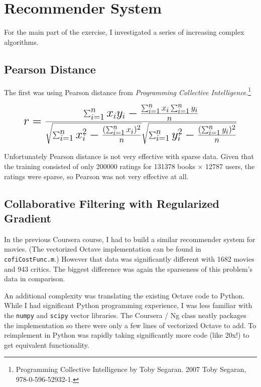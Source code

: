 \documentclass[11pt, oneside]{article}   	%
\begin{document}
\section*{Recommender System}

For the main part of the exercise, I investigated a series of increasing complex algorithms. 

\subsection*{Pearson Distance}

The first was using Pearson distance from \emph{Programming Collective Intelligence}.\footnote{Programming Collective Intelligence by Toby Segaran. \textsuperscript{\textcopyright} 2007 Toby Segaran, 978-0-596-52932-1.}

\begin{equation}
\mathlarger{\mathlarger{\mathlarger{
r = \frac{\sum_{i=1}^n x_iy_i - \frac{\sum_{i=1}^n x_i \sum_{i=1}^n y_i} {n}} 
     { \sqrt{\sum_{i=1}^n x_i^2 - \frac{(\sum_{i=1}^n x_i)^2}{n}} 
        \sqrt{\sum_{i=1}^n y_i^2 - \frac{(\sum_{i=1}^n y_i)^2}{n}} }
}}}
\end{equation}

Unfortunately Pearson distance is not very effective with sparse data. Given that the training consisted of only 200000 ratings for 131378 books $\times$ 12787 users, the ratings were sparse, so Pearson was not very effective at all.

\subsection*{Collaborative Filtering with Regularized Gradient}

\par In the previous Coursera course, I had to build a similar recommender system for movies. (The vectorized Octave implementation can be found in \texttt{cofiCostFunc.m}.) However that data was significantly different with 1682 movies and 943 critics. The biggest difference was again the sparseness of this problem's data in comparison.

An additional complexity was translating the existing Octave code to Python. While I had significant Python programming experience, I was less familiar with the \texttt{numpy} and \texttt{scipy} vector libraries. The Coursera / Ng class neatly packages the implementation so there were only a few lines of vectorized Octave to add. To reimplement in Python was rapidly taking significantly more code (like 20x!) to get equivalent functionality. 
\end{document}
